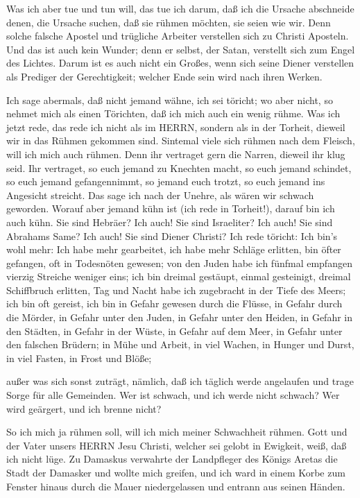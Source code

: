  Was ich aber tue und tun will, das tue ich darum, daß ich
die Ursache abschneide denen, die Ursache suchen, daß sie rühmen
möchten, sie seien wie wir.  Denn solche falsche Apostel
und trügliche Arbeiter verstellen sich zu Christi Aposteln.
 Und das ist auch kein Wunder; denn er selbst, der Satan,
verstellt sich zum Engel des Lichtes.  Darum ist es auch
nicht ein Großes, wenn sich seine Diener verstellen als Prediger der
Gerechtigkeit; welcher Ende sein wird nach ihren Werken.

 Ich sage abermals, daß nicht jemand wähne, ich sei
töricht; wo aber nicht, so nehmet mich als einen Törichten, daß ich mich
auch ein wenig rühme.  Was ich jetzt rede, das rede ich
nicht als im HERRN, sondern als in der Torheit, dieweil wir in das
Rühmen gekommen sind.  Sintemal viele sich rühmen nach dem
Fleisch, will ich mich auch rühmen.  Denn ihr vertraget
gern die Narren, dieweil ihr klug seid.  Ihr vertraget, so
euch jemand zu Knechten macht, so euch jemand schindet, so euch jemand
gefangennimmt, so jemand euch trotzt, so euch jemand ins Angesicht
streicht.  Das sage ich nach der Unehre, als wären wir
schwach geworden. Worauf aber jemand kühn ist (ich rede in Torheit!),
darauf bin ich auch kühn.  Sie sind Hebräer? Ich auch! Sie
sind Israeliter? Ich auch! Sie sind Abrahams Same? Ich auch!
 Sie sind Diener Christi? Ich rede töricht: Ich bin's wohl
mehr: Ich habe mehr gearbeitet, ich habe mehr Schläge erlitten, bin
öfter gefangen, oft in Todesnöten gewesen;  von den Juden
habe ich fünfmal empfangen vierzig Streiche weniger eins; 
ich bin dreimal gestäupt, einmal gesteinigt, dreimal Schiffbruch
erlitten, Tag und Nacht habe ich zugebracht in der Tiefe des Meers;
 ich bin oft gereist, ich bin in Gefahr gewesen durch die
Flüsse, in Gefahr durch die Mörder, in Gefahr unter den Juden, in Gefahr
unter den Heiden, in Gefahr in den Städten, in Gefahr in der Wüste, in
Gefahr auf dem Meer, in Gefahr unter den falschen Brüdern; 
in Mühe und Arbeit, in viel Wachen, in Hunger und Durst, in viel Fasten,
in Frost und Blöße;

 außer was sich sonst zuträgt, nämlich, daß ich täglich
werde angelaufen und trage Sorge für alle Gemeinden.  Wer
ist schwach, und ich werde nicht schwach? Wer wird geärgert, und ich
brenne nicht?

 So ich mich ja rühmen soll, will ich mich meiner
Schwachheit rühmen.  Gott und der Vater unsers HERRN Jesu
Christi, welcher sei gelobt in Ewigkeit, weiß, daß ich nicht lüge.
 Zu Damaskus verwahrte der Landpfleger des Königs Aretas
die Stadt der Damasker und wollte mich greifen,  und ich
ward in einem Korbe zum Fenster hinaus durch die Mauer niedergelassen
und entrann aus seinen Händen.

